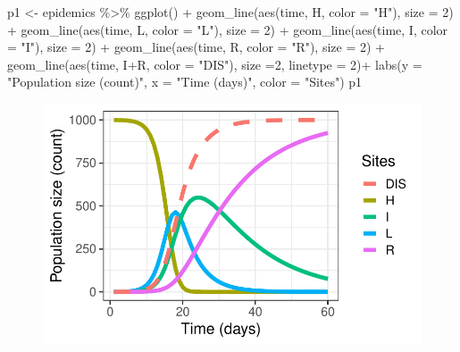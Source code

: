 \documentclass[
  letterpaper,
  DIV=11,
  numbers=noendperiod]{scrreprt}
\newenvironment{Shaded}{\begin{snugshade}}{\end{snugshade}}
\newcommand{\AttributeTok}[1]{\textcolor[rgb]{0.40,0.45,0.13}{#1}}
\newcommand{\DecValTok}[1]{\textcolor[rgb]{0.68,0.00,0.00}{#1}}
\newcommand{\FunctionTok}[1]{\textcolor[rgb]{0.28,0.35,0.67}{#1}}
\newcommand{\NormalTok}[1]{\textcolor[rgb]{0.00,0.23,0.31}{#1}}
\newcommand{\OtherTok}[1]{\textcolor[rgb]{0.00,0.23,0.31}{#1}}
\newcommand{\SpecialCharTok}[1]{\textcolor[rgb]{0.37,0.37,0.37}{#1}}
\newcommand{\StringTok}[1]{\textcolor[rgb]{0.13,0.47,0.30}{#1}}
\begin{document}
\begin{Shaded}
\begin{Highlighting}[]
\NormalTok{p1 }\OtherTok{\textless{}{-}}\NormalTok{ epidemics }\SpecialCharTok{\%\textgreater{}\%}
  \FunctionTok{ggplot}\NormalTok{() }\SpecialCharTok{+}
  \FunctionTok{geom\_line}\NormalTok{(}\FunctionTok{aes}\NormalTok{(time, H, }\AttributeTok{color =} \StringTok{"H"}\NormalTok{), }\AttributeTok{size =} \DecValTok{2}\NormalTok{) }\SpecialCharTok{+}
  \FunctionTok{geom\_line}\NormalTok{(}\FunctionTok{aes}\NormalTok{(time, L, }\AttributeTok{color =} \StringTok{"L"}\NormalTok{), }\AttributeTok{size =} \DecValTok{2}\NormalTok{) }\SpecialCharTok{+}
  \FunctionTok{geom\_line}\NormalTok{(}\FunctionTok{aes}\NormalTok{(time, I, }\AttributeTok{color =} \StringTok{"I"}\NormalTok{), }\AttributeTok{size =} \DecValTok{2}\NormalTok{) }\SpecialCharTok{+}
  \FunctionTok{geom\_line}\NormalTok{(}\FunctionTok{aes}\NormalTok{(time, R, }\AttributeTok{color =} \StringTok{"R"}\NormalTok{), }\AttributeTok{size =} \DecValTok{2}\NormalTok{) }\SpecialCharTok{+}
  \FunctionTok{geom\_line}\NormalTok{(}\FunctionTok{aes}\NormalTok{(time, I}\SpecialCharTok{+}\NormalTok{R, }\AttributeTok{color =} \StringTok{"DIS"}\NormalTok{), }\AttributeTok{size =}\DecValTok{2}\NormalTok{, }\AttributeTok{linetype =} \DecValTok{2}\NormalTok{)}\SpecialCharTok{+}
  \FunctionTok{labs}\NormalTok{(}\AttributeTok{y =} \StringTok{"Population size (count)"}\NormalTok{, }\AttributeTok{x =} \StringTok{"Time (days)"}\NormalTok{, }\AttributeTok{color =} \StringTok{"Sites"}\NormalTok{) }
\NormalTok{ p1}
\end{Highlighting}
\end{Shaded}

\begin{figure}[H]

{\centering \includegraphics{./temporal-simulation_files/figure-pdf/unnamed-chunk-10-1.pdf}

}

\end{figure}
\end{document}
